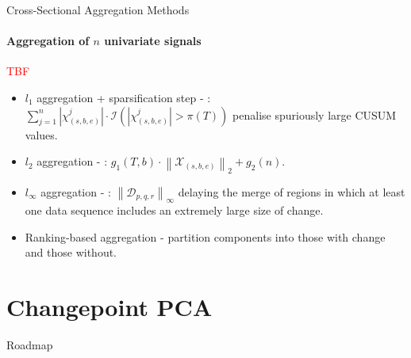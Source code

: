\documentclass{beamer}
\begin{document}
\begin{frame}{Cross-Sectional Aggregation Methods}
\framesubtitle{Aggregation of $n$ univariate signals}
    
\textcolor{red}{TBF}
    
\begin{itemize}
    \item $l_1$ aggregation + sparsification step - \cite{cho2015multiple}: $\sum_{j=1}^n \left | \chi^j_{(s,b,e)} \right | \cdot \mathcal{I} \left ( \left | \chi^j_{(s,b,e)} \right | > \pi(T) \right ) $ penalise spuriously large CUSUM values. 
    \item $l_2$ aggregation - \cite{enikeeva2013high}: $g_1(T,b) \cdot \left \| \mathcal{X}_{(s,b,e)} \right \|_2 + g_2(n)$.
    \item $l_\infty$ aggregation - \cite{maeng2019adaptive}: $\left \| \mathcal{D}_{p,q,r} \right \|_\infty$ delaying the merge of regions in which at least one data sequence includes an extremely large size of change. 
    \item Ranking-based aggregation \cite{cho2015multiple} - partition components into those with change and those without. 
\end{itemize}
    
\end{frame}




\section{Changepoint PCA}




\begin{frame}{Roadmap}
\tableofcontents[currentsection]
\end{frame}



\end{document}
